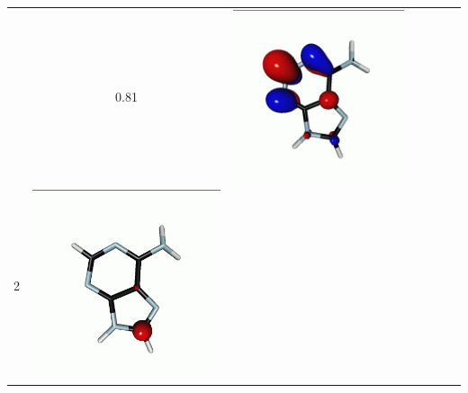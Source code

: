 \documentclass[journal=jctcce,manuscript=article]{achemso}
\begin{document}
\begin{table}[H]
\begin{tabular}{ l| c c c | c c c }
\begin{minipage}{0.2\textwidth}
    \end{minipage}
    & 0.81
    & 
    \begin{minipage}{0.2\textwidth}
        \centering
        \includegraphics[scale=0.10]{NTO/Adenine_C/1p_Cs.png}
    \end{minipage}
    \\
        2 &  
    \begin{minipage}{0.2\textwidth}
        \centering
        \includegraphics[scale=0.10]{NTO/Adenine_C/2h_C1.png}

\end{minipage}
\end{tabular}
\end{table}
\end{document}
